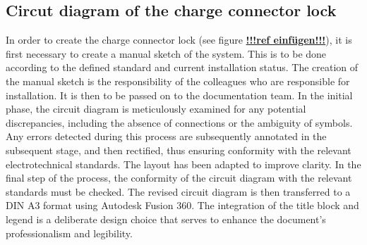 
\addtocounter{page}{1}

\subsection{Circut diagram of the charge connector lock }

In order to create the charge connector lock (see figure \textbf{\underline{!!!ref einfügen!!!}}), it is first necessary to create a manual sketch of the system. This is to be done according to the defined standard and current installation status. The creation of the manual sketch is the responsibility of the colleagues who are responsible for installation. It is then to be passed on to the documentation team. In the initial phase, the circuit diagram is meticulously examined for any potential discrepancies, including the absence of connections or the ambiguity of symbols. Any errors detected during this process are subsequently annotated in the subsequent stage, and then rectified, thus ensuring conformity with the relevant electrotechnical standards. The layout has been adapted to improve clarity. In the final step of the process, the conformity of the circuit diagram with the relevant standards must be checked. The revised circuit diagram is then transferred to a DIN A3 format using Autodesk Fusion 360. The integration of the title block and legend is a deliberate design choice that serves to enhance the document's professionalism and legibility.

